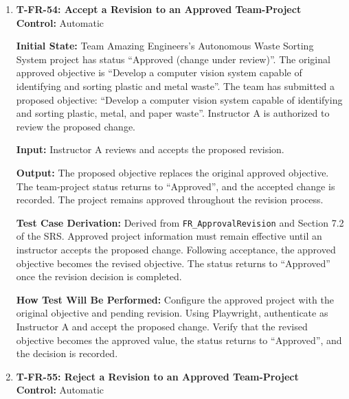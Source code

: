 \documentclass[12pt, titlepage]{article}
\begin{document}
\begin{enumerate}
\textbf{How Test Will Be Performed:} Configure a controlled external test service to fail during synchronization. Trigger the adapter and verify that Keystone displays a failure indicator. Confirm that the team-project status remains unchanged, no approval decision is incorrectly recorded, and the last successful synchronization timestamp is preserved.

\item \label{T-FR-54}\textbf{T-FR-54: Accept a Revision to an Approved Team-Project}\\

\textbf{Control:} Automatic

\textbf{Initial State:} Team Amazing Engineers's Autonomous Waste Sorting System project has status ``Approved (change under review)''. The original approved objective is ``Develop a computer vision system capable of identifying and sorting plastic and metal waste''. The team has submitted a proposed objective: ``Develop a computer vision system capable of identifying and sorting plastic, metal, and paper waste''. Instructor A is authorized to review the proposed change.

\textbf{Input:} Instructor A reviews and accepts the proposed revision.

\textbf{Output:} The proposed objective replaces the original approved objective. The team-project status returns to ``Approved'', and the accepted change is recorded. The project remains approved throughout the revision process.

\textbf{Test Case Derivation:} Derived from \texttt{FR\_ApprovalRevision} and Section 7.2 of the SRS. Approved project information must remain effective until an instructor accepts the proposed change. Following acceptance, the approved objective becomes the revised objective. The status returns to ``Approved'' once the revision decision is completed.

\textbf{How Test Will Be Performed:} Configure the approved project with the original objective and pending revision. Using Playwright, authenticate as Instructor A and accept the proposed change. Verify that the revised objective becomes the approved value, the status returns to ``Approved'', and the decision is recorded.

\item \label{T-FR-55}\textbf{T-FR-55: Reject a Revision to an Approved Team-Project}\\

\textbf{Control:} Automatic


\end{enumerate}
\end{document}
